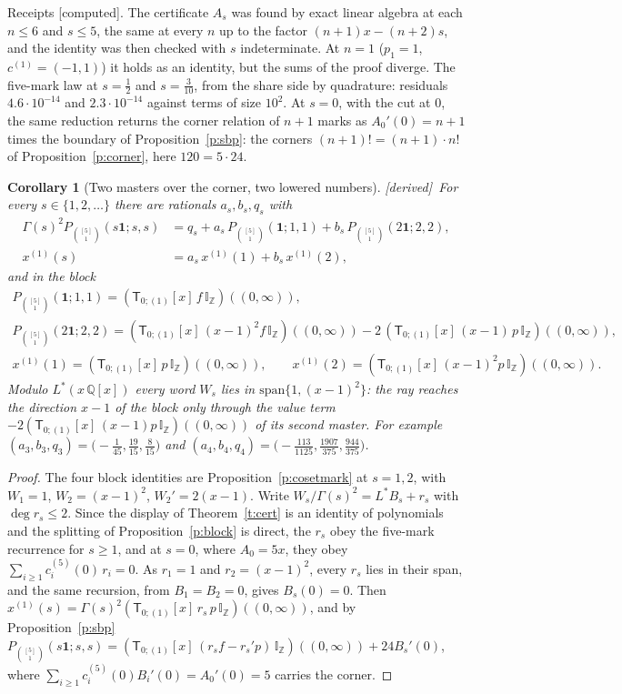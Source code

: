\documentclass[11pt]{article}
\newcommand{\one}{\mathbf 1}
\newcommand{\sT}{\mathsf T}
\newcommand{\IZ}{\mathbb I_{\mathbb Z}}
\newcommand{\Tx}[3]{(\sT_{#1;(1)}[x]\,#2)((#3,\infty))}
\theoremstyle{plain}
\newtheorem{corollary}[proposition]{Corollary}
\theoremstyle{definition}
\theoremstyle{remark}
\newcommand{\derived}{\textup{[derived]}}
\newcommand{\computed}{\textup{[computed]}}
\begin{document}
\noindent Receipts \computed. The certificate $A_s$ was found by exact linear algebra at each $n\le6$ and $s\le5$, the same at every $n$ up to the factor $(n+1)x-(n+2)s$, and the identity was then checked with $s$ indeterminate. At $n=1$ ($p_1=1$, $c^{(1)}=(-1,1)$) it holds as an identity, but the sums of the proof diverge. The five-mark law at $s=\frac12$ and $s=\frac3{10}$, from the share side by quadrature: residuals $4.6\cdot10^{-14}$ and $2.3\cdot10^{-14}$ against terms of size $10^2$. At $s=0$, with the cut at $0$, the same reduction returns the corner relation of $n+1$ marks as $A_0'(0)=n+1$ times the boundary of Proposition~\ref{p:sbp}: the corners $(n+1)!=(n+1)\cdot n!$ of Proposition~\ref{p:corner}, here $120=5\cdot24$.

\begin{corollary}[Two masters over the corner, two lowered numbers]\label{c:masters}\derived\
For every $s\in\{1,2,\dots\}$ there are rationals $a_s,b_s,q_s$ with
\begin{align*}
\Gamma(s)^2P_{\binom{[5]}1}(s\one;s,s)&=q_s+a_s\,P_{\binom{[5]}1}(\one;1,1)+b_s\,P_{\binom{[5]}1}(2\one;2,2),\\
x^{(1)}(s)&=a_s\,x^{(1)}(1)+b_s\,x^{(1)}(2),
\end{align*}
and in the block
\begin{gather*}
P_{\binom{[5]}1}(\one;1,1)=\Tx{0}{f\,\IZ}{0},\\
P_{\binom{[5]}1}(2\one;2,2)=\Tx{0}{(x-1)^2f\,\IZ}{0}-2\,\Tx{0}{(x-1)\,p\,\IZ}{0},\\
x^{(1)}(1)=\Tx{0}{p\,\IZ}{0},\qquad x^{(1)}(2)=\Tx{0}{(x-1)^2p\,\IZ}{0}.
\end{gather*}
Modulo $L^\ast(x\,\mathbb Q[x])$ every word $W_s$ lies in $\mathrm{span}\{1,(x-1)^2\}$: the ray reaches the direction $x-1$ of the block only through the value term $-2\Tx{0}{(x-1)p\,\IZ}{0}$ of its second master. For example $(a_3,b_3,q_3)=\big(-\frac1{45},\frac{19}{15},\frac8{15}\big)$ and $(a_4,b_4,q_4)=\big(-\frac{113}{1125},\frac{1907}{375},\frac{944}{375}\big)$.
\end{corollary}

\begin{proof}
The four block identities are Proposition~\ref{p:cosetmark} at $s=1,2$, with $W_1=1$, $W_2=(x-1)^2$, $W_2'=2(x-1)$. Write $W_s/\Gamma(s)^2=L^\ast B_s+r_s$ with $\deg r_s\le2$. Since the display of Theorem~\ref{t:cert} is an identity of polynomials and the splitting of Proposition~\ref{p:block} is direct, the $r_s$ obey the five-mark recurrence for $s\ge1$, and at $s=0$, where $A_0=5x$, they obey $\sum_{i\ge1}c^{(5)}_i(0)\,r_i=0$. As $r_1=1$ and $r_2=(x-1)^2$, every $r_s$ lies in their span, and the same recursion, from $B_1=B_2=0$, gives $B_s(0)=0$. Then $x^{(1)}(s)=\Gamma(s)^2\Tx{0}{r_s\,p\,\IZ}{0}$, and by Proposition~\ref{p:sbp} $P_{\binom{[5]}1}(s\one;s,s)=\Tx{0}{(r_sf-r_s'p)\,\IZ}{0}+24B_s'(0)$, where $\sum_{i\ge1}c^{(5)}_i(0)B_i'(0)=A_0'(0)=5$ carries the corner.
\end{proof}
\end{document}
